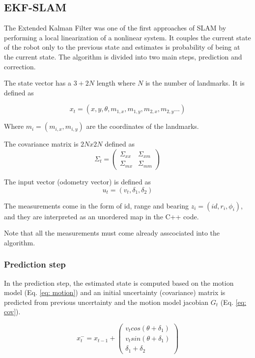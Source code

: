 \documentclass[conference]{IEEEtran}
\begin{document}
\subsection{EKF-SLAM}

The Extended Kalman Filter was one of the first approaches of SLAM by performing a local linearization of a nonlinear system. It couples the current state of the robot only to the previous state and estimates is probability of being at the current state. The algorithm is divided into two main steps, prediction and correction.

The state vector has a $3 + 2N$ length where $N$ is the number of landmarks. It is defined as 

$$x_t = (x, y, \theta, m_{1,x}, m_{1,y}, m_{2,x}, m_{2,y} ...)$$ 

Where $m_i =(m_{i,x}, m_{i,y})$ are the coordinates of the landmarks. 

The covariance matrix is $2N x 2N$ defined as
$$ \Sigma_{t} =  \begin{pmatrix}
\Sigma_{xx} & \Sigma_{xm} \\
\Sigma_{mx} & \Sigma_{mm} 
\end{pmatrix} $$

The input vector (odometry vector) is defined as 
$$ u_t = (v_t, \delta_1, \delta_2) $$

The measurements come in the form of id, range and bearing $z_i = (id, r_i, \phi_i)$, and they are interpreted as an unordered map in the C++ code.

Note that all the measurements must come already asscociated into the algorithm.

\subsubsection{Prediction step}
In the prediction step, the estimated state is computed based on the motion model (Eq. \ref{eq: motion}) and an initial uncertainty (covariance) matrix is predicted from previous uncertainty and the motion model jacobian $G_t$ (Eq. \ref{eq: cov}). 

\begin{equation} \label{eq: motion}
    x_t^- = x_{t-1} + \begin{pmatrix}
    v_t cos(\theta + \delta_1 ) \\
    v_t sin(\theta + \delta_1 ) \\
    \delta_1 + \delta_2 
    \end{pmatrix}  
\end{equation}
\end{document}
